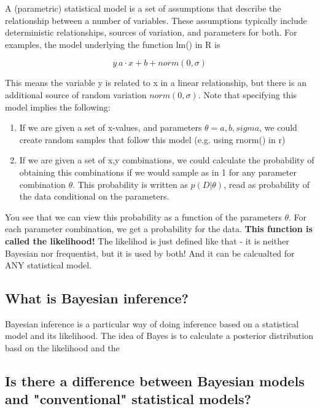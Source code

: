 \documentclass[10pt,a4paper]{article}
\begin{document}
A (parametric) statistical model is a set of assumptions that describe the relationship between a number of variables. These assumptions typically include deterministic relationships, sources of variation, and parameters for both. For examples, the model underlying the function lm() in R is 

\begin{equation}
y ~ a \cdot x + b + norm(0,\sigma)
\end{equation}

This means the variable y is related to x in a linear relationship, but there is an additional source of random variation $norm(0,\sigma)$. Note that specifying this model implies the following: 

\begin{enumerate}
\item If we are given a set of x-values, and parameters $\theta = {a,b,sigma}$, we could create random samples that follow this model (e.g. using rnorm() in r)
\item If we are given a set of x,y combinations, we could calculate the probability of obtaining this combinations if we would sample as in 1 for any parameter combination $\theta$. This probability is written as $p(D|\theta)$, read as probability of the data conditional on the parameters.
\end{enumerate}

You see that we can view this probability as a function of the parameters $\theta$. For each parameter combination, we get a probability for the data. \textbf{This function is called the likelihood!} The likelihod is just defined like that - it is neither Bayesian nor frequentist, but it is used by both! And it can be calcualted for ANY statistical model.

\subsection{What is Bayesian inference?}

Bayesian inference is a particular way of doing inference based on a statistical model and its likelihood. The idea of Bayes is to calculate a posterior distribution basd on the likelihood and the 



\subsection{Is there a difference between Bayesian models and "conventional" statistical models?}
\end{document}
